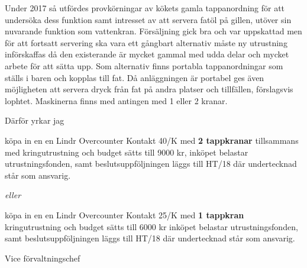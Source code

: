 \documentclass[../_main/handlingar.tex]{subfiles}
\begin{document}

Under 2017 så utfördes provkörningar av kökets gamla tappanordning för att undersöka dess funktion samt intresset av att servera fatöl på gillen, utöver sin nuvarande funktion som vattenkran. Försäljning gick bra och var uppskattad men för att fortsatt servering ska vara ett gångbart alternativ måste ny utrustning införskaffas då den existerande är mycket gammal med udda delar och mycket arbete för att sätta upp. Som alternativ finns portabla tappanordningar som ställs i baren och kopplas till fat. Då anläggningen är portabel ges även möjligheten att servera dryck från fat på andra platser och tillfällen, förslagsvis lophtet. Maskinerna finns med antingen med 1 eller 2 kranar.

Därför yrkar jag
\begin{attsatser}
    \att köpa in en en Lindr Overcounter Kontakt 40/K med \textbf{2 tappkranar} tillsammans med kringutrustning och budget sätts till 9000 kr,
    \att inköpet belastar utrustningsfonden, samt
    \att beslutsuppföljningen läggs till HT/18 där undertecknad står som ansvarig.
\end{attsatser}

\textit{eller}

\begin{attsatser}
    \att köpa in en en Lindr Overcounter Kontakt 25/K med \textbf{1 tappkran} kringutrustning och budget sätts till 6000 kr
    \att inköpet belastar utrustningsfonden, samt
    \att beslutsuppföljningen läggs till HT/18 där undertecknad står som ansvarig.
\end{attsatser}

\begin{signatures}{1}
    \mvh
    \signature{Markus Rahne}{Vice förvaltningschef}
    \end{signatures}
\end{document}
